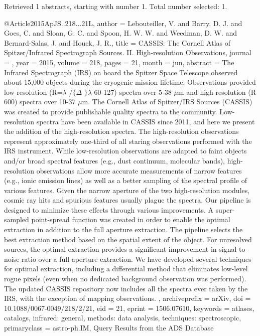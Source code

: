 \documentclass[longauth]{aa}
\begin{document}
{{{{{{{Retrieved 1 abstracts, starting with number 1.  Total number selected: 1.

@Article{2015ApJS..218...21L,
  author        = {Lebouteiller, V. and Barry, D. J. and Goes, C. and Sloan, G. C. and Spoon, H. W. W. and Weedman, D. W. and Bernard-Salas, J. and Houck, J. R.},
  title         = {CASSIS: The Cornell Atlas of Spitzer/Infrared Spectrograph Sources. II. High-resolution Observations},
  journal       = {\apjs},
  year          = {2015},
  volume        = {218},
  pages         = {21},
  month         = jun,
  abstract      = {The Infrared Spectrograph (IRS) on board the Spitzer Space Telescope
observed about 15,000 objects during the cryogenic mission lifetime.
Observations provided low-resolution (R={$\lambda$} /$\{${$\Delta$} $\}${$\lambda$}
{\ap} 60-127) spectra over {\ap} 5-38 {$\mu$}m and high-resolution (R{\ap}
600) spectra over 10-37 {$\mu$}m. The Cornell Atlas of Spitzer/IRS
Sources (CASSIS) was created to provide publishable quality spectra to
the community. Low-resolution spectra have been available in CASSIS
since 2011, and here we present the addition of the high-resolution
spectra. The high-resolution observations represent approximately
one-third of all staring observations performed with the IRS instrument.
While low-resolution observations are adapted to faint objects and/or
broad spectral features (e.g., dust continuum, molecular bands),
high-resolution observations allow more accurate measurements of narrow
features (e.g., ionic emission lines) as well as a better sampling of
the spectral profile of various features. Given the narrow aperture of
the two high-resolution modules, cosmic ray hits and spurious features
usually plague the spectra. Our pipeline is designed to minimize these
effects through various improvements. A super-sampled point-spread
function was created in order to enable the optimal extraction in
addition to the full aperture extraction. The pipeline selects the best
extraction method based on the spatial extent of the object. For
unresolved sources, the optimal extraction provides a significant
improvement in signal-to-noise ratio over a full aperture extraction. We
have developed several techniques for optimal extraction, including a
differential method that eliminates low-level rogue pixels (even when no
dedicated background observation was performed). The updated CASSIS
repository now includes all the spectra ever taken by the IRS, with the
exception of mapping observations.
},
  archiveprefix = {arXiv},
  doi           = {10.1088/0067-0049/218/2/21},
  eid           = {21},
  eprint        = {1506.07610},
  keywords      = {atlases, catalogs, infrared: general, methods: data analysis, techniques: spectroscopic},
  primaryclass  = {astro-ph.IM},
}
Query Results from the ADS Database


}}}}}}}
\end{document}
